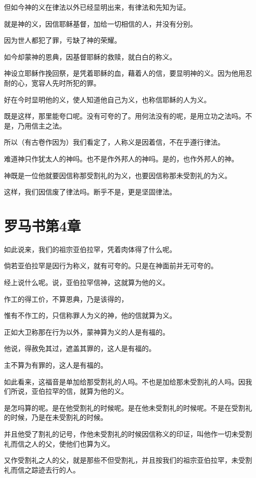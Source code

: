 \documentclass[12pt,oneside]{book}
\begin{document}
但如今神的义在律法以外已经显明出来，有律法和先知为证。

就是神的义，因信耶稣基督，加给一切相信的人，并没有分别。

因为世人都犯了罪，亏缺了神的荣耀。

如今却蒙神的恩典，因基督耶稣的救赎，就白白的称义。

神设立耶稣作挽回祭，是凭着耶稣的血，藉着人的信，要显明神的义。因为他用忍耐的心，宽容人先时所犯的罪。

好在今时显明他的义，使人知道他自己为义，也称信耶稣的人为义。

既是这样，那里能夸口呢。没有可夸的了。用何法没有的呢，是用立功之法吗。不是，乃用信主之法。

所以（有古卷作因为）我们看定了，人称义是因着信，不在乎遵行律法。

难道神只作犹太人的神吗。也不是作外邦人的神吗。是的，也作外邦人的神。

神既是一位他就要因信称那受割礼的为义，也要因信称那未受割礼的为义。

这样，我们因信废了律法吗。断乎不是，更是坚固律法。

\chapter{罗马书第4章}
如此说来，我们的祖宗亚伯拉罕，凭着肉体得了什么呢。

倘若亚伯拉罕是因行为称义，就有可夸的。只是在神面前并无可夸的。

经上说什么呢。说，亚伯拉罕信神，这就算为他的义。

作工的得工价，不算恩典，乃是该得的，

惟有不作工的，只信称罪人为义的神，他的信就算为义。

正如大卫称那在行为以外，蒙神算为义的人是有福的。

他说，得赦免其过，遮盖其罪的，这人是有福的。

主不算为有罪的，这人是有福的。

如此看来，这福音是单加给那受割礼的人吗。不也是加给那未受割礼的人吗。因我们所说，亚伯拉罕的信，就算为他的义。

是怎吗算的呢。是在他受割礼的时候呢。是在他未受割礼的时候呢。不是在受割礼的时候，乃是在未受割礼的时候。

并且他受了割礼的记号，作他未受割礼的时候因信称义的印证，叫他作一切未受割礼而信之人的父，使他们也算为义。

又作受割礼之人的父，就是那些不但受割礼，并且按我们的祖宗亚伯拉罕，未受割礼而信之踪迹去行的人。
\end{document}
